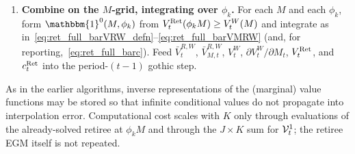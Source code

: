 \begin{enumerate}
	\begin{align}
		\eff_t(A_i)
		&= 1-\exp\bigl(-\beta(1-p)(\goth{V}_t^{1}(A_i)-\goth{V}_t^{2}(A_i))/\sigma_s\bigr),
		\\
		\theta(\eff_t(A_i))
		&= \sigma_s\bigl(\eff_t(A_i)+(1-\eff_t(A_i))\log(1-\eff_t(A_i))\bigr),
		\\
		P_1(\eff_t(A_i))
		&= (1-\eff_t(A_i))p+\eff_t(A_i),
		\\
		P_2(\eff_t(A_i))
		&= (1-\eff_t(A_i))(1-p),
		\\
		\mathrm{RHS}(A_i)
		&= R\beta\bigl(
			P_1(\eff_t(A_i))\,\mathrm{RHS}_1(A_i)
			+P_2(\eff_t(A_i))\,\mathrm{RHS}_2(A_i)
		\bigr),
		\\
		c_t^{W}(A_i)
		&= \mathrm{RHS}(A_i)^{-1},
		\\
		\mathbb{E}V_{t+1}(A_i)
		&= P_1(\eff_t(A_i))\,\goth{V}_t^{1}(A_i)
		+P_2(\eff_t(A_i))\,\goth{V}_t^{2}(A_i),
		\\
		V_t^{W}(M_t(A_i))
		&= \log(c_t^{W}(A_i))-\delta-\theta(\eff_t(A_i))
		+\beta\,\mathbb{E}V_{t+1}(A_i),
		\\
		M_t(A_i)
		&= c_t^{W}(A_i)+A_i.
	\end{align}
	Interpolate $c_t^{W}$ and $V_t^{W}$ onto the common $M$-grid. If there is not enough smoothness, apply an upper-envelope refinement as in Algorithm~1 of the main text.
	\item \textbf{Combine on the $M$-grid, integrating over $\phi_k$.} For each $M$ and each $\phi_k$, form $\mathbbm{1}^{0}(M,\phi_k)$ from $V_t^{\mathrm{Ret}}(\phi_k M)\ge V_t^{W}(M)$ and integrate as in~\eqref{eq:ret_full_barVRW_defn}--\eqref{eq:ret_full_barVMRW} (and, for reporting,~\eqref{eq:ret_full_barc}). Feed $\bar V_t^{R,W}$, $\bar V_{M,t}^{R,W}$, $V_t^{W}$, $\partial V_t^{W}/\partial M_t$, $V_t^{\mathrm{Ret}}$, and $c_t^{\mathrm{Ret}}$ into the period-$(t-1)$ gothic step.
\end{enumerate}
As in the earlier algorithms, inverse representations of the (marginal) value functions may be stored so that infinite conditional values do not propagate into interpolation error. Computational cost scales with $K$ only through evaluations of the already-solved retiree at $\phi_k M$ and through the $J\times K$ sum for $\mathcal{V}_t^{1}$; the retiree EGM itself is not repeated.
